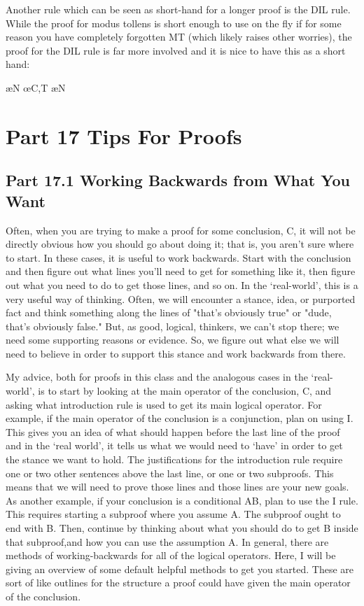 Another rule which can be seen as short-hand for a longer proof is the DIL rule. While the proof for modus tollens is short enough to use on the fly if for some reason you have completely forgotten MT (which likely raises other worries), the proof for the DIL rule is far more involved and it is nice to have this as a short hand:
\begin{fitchproof}
\open
	 
	 \ae{N}
	 
	 \oe{C,T}
	 
	 \ae{N}
\close
{} 
\end{fitchproof}
\chapter{Part 17 Tips For Proofs}
\section{Part 17.1 Working Backwards from What You Want}
Often, when you are trying to make a proof for some conclusion, C, it will not be directly obvious how you should go about doing it; that is, you aren't sure where to start. In these cases, it is useful to work backwards. Start with the conclusion and then figure out what lines you'll need to get for something like it, then figure out what you need to do to get those lines, and so on. In the `real-world', this is a very useful way of thinking. Often, we will encounter a stance, idea, or purported fact and think something along the lines of "that's obviously true" or "dude, that's obviously false." But, as good, logical, thinkers, we can't stop there; we need some supporting reasons or evidence. So, we figure out what else we will need to believe in order to support this stance and work backwards from there.

My advice, both for proofs in this class and the analogous cases in the `real-world', is to start by looking at the main operator of the conclusion, C, and asking what introduction rule is used to get its main logical operator. For example, if the main operator of the conclusion is a conjunction, plan on using \eand I. This gives you an idea of what should happen before the last line of the proof and in the `real world', it tells us what we would need to `have' in order to get the stance we want to hold. The justifications for the introduction rule require one or two other sentences above the last line, or one or two subproofs. This means that we will need to prove those lines and those lines are your new goals. As another example, if your conclusion is a conditional A\eif B, plan to use the \eif I rule. This requires starting a subproof where you assume A. The subproof ought to end with B. Then, continue by thinking about what you should do to get B inside that subproof,and how you can use the assumption A. In general, there are methods of working-backwards for all of the logical operators. Here, I will be giving an overview of some default helpful methods to get you started. These are sort of like outlines for the structure a proof could have given the main operator of the conclusion.


